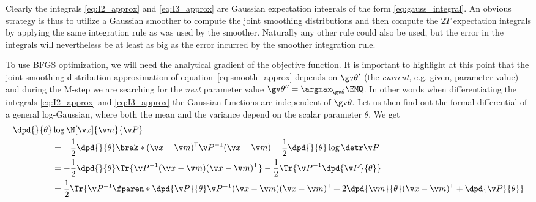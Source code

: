 Clearly the integrals \eqref{eq:I2_approx} and \eqref{eq:I3_approx} are Gaussian
expectation integrals of the form \eqref{eq:gauss_integral}. An obvious
strategy is thus to utilize a Gaussian smoother to compute the joint
smoothing distributions and then compute the $2T$ expectation integrals
by applying the same integration rule as was used by the smoother. Naturally
any other rule could also be used, but the error in the integrals
will nevertheless be at least as big as the error incurred by the smoother
integration rule.

To use BFGS optimization, we will need the analytical gradient of the objective function.
It is important to highlight at this point that the joint smoothing distribution approximation
of equation~\eqref{eq:smooth_approx} depends on $\Th'$ (the \emph{current}, e.g. given, parameter value)
and during the M-step we are searching for the \emph{next} parameter value $\Th^{\prime\prime}=\argmax_{\Th}\EMQ$. In other words
when differentiating the integrals \eqref{eq:I2_approx} and \eqref{eq:I3_approx} the Gaussian functions
are independent of $\Th$.
Let us then find out the formal differential of a general log-Gaussian, where
both the mean and the variance depend on the scalar parameter $\theta$. We get
\begin{align}
	\dpd{}{\theta}&\log\N[\x]{\m}{\P}\\
	&=-\frac{1}{2}\dpd{}{\theta}\brak*{(\x-\m)^\tr\P^{-1}(\x-\m)}-\frac{1}{2}\dpd{}{\theta}\log\detr\P\\		
	&=-\frac{1}{2}\dpd{}{\theta}\Tr{\P^{-1}(\x-\m)(\x-\m)^\tr}-\frac{1}{2}\Tr{\P^{-1}\dpd{\P}{\theta}}\\		
	&=\frac{1}{2}\Tr{\P^{-1}\fparen*{\dpd{\P}{\theta}\P^{-1}(\x-\m)(\x-\m)^\tr+2\dpd{\m}{\theta}(\x-\m)^\tr+\dpd{\P}{\theta}}}		
\end{align}



